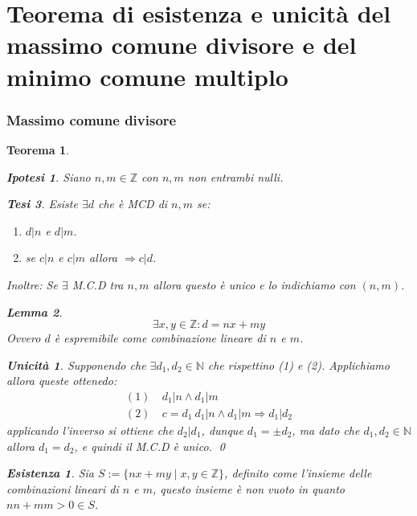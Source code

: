 \documentclass{article}
\makeatletter
\renewenvironment{proof}[1][\proofname]{\par
    \pushQED{\qed}%
    \normalfont \topsep6\p@\@plus6\p@\relax
    \trivlist
    \item\relax
    {\itshape
    #1\@addpunct{.}}\hspace\labelsep\ignorespaces
    }{%
    \popQED\endtrivlist\@endpefalse
}
\newtheorem{theorem}{Teorema}[part]
\newtheorem{lemma}{Lemma}[theorem]
\newtheorem{ipothesis}[lemma]{Ipotesi}
\newtheorem{thesis}[lemma]{Tesi}
\newtheorem*{existence}{Esistenza}
\newtheorem*{uniqueness}{Unicità}
\makeatother
\begin{document}
\part{Teorema di esistenza e unicità del massimo comune divisore e del minimo comune multiplo}
\section{Massimo comune divisore}
\begin{theorem}
    \begin{ipothesis}
        Siano \(n,m\in\mathbb{Z}\) con \(n,m\) non entrambi nulli.
    \end{ipothesis}
    \begin{thesis}
        Esiste \(\exists d\) che è MCD di \(n,m\) se:
        \begin{enumerate}
            \item \(d|n\) e \(d|m\).
            \item se \(c|n\) e \(c|m\) allora \(\Rightarrow c|d\).
        \end{enumerate} 
        Inoltre: Se \(\exists\) M.C.D tra \(n,m\) allora questo è unico e lo indichiamo con \((n,m)\).
        \begin{lemma}
            \[
                \exists x,y\in\mathbb{Z}: d=nx+my
            \]
            Ovvero \(d\) è espremibile come combinazione lineare di \(n\) e \(m\).
        \end{lemma}
    \end{thesis}
    \begin{proof}
        \begin{uniqueness}
            Supponendo che \(\exists d_1,d_2\in\mathbb{N}\) che rispettino (1) e (2). Applichiamo allora queste ottenedo:
            \[
                \begin{aligned}
                    (1)&\ d_1|n \wedge d_1|m\\
                    (2)&\ c=d_1\ d_1|n \wedge d_1|m \Rightarrow d_1|d_2
                \end{aligned}
            \]
            applicando l'inverso si ottiene che \(d_2|d_1\), dunque \(d_1=\pm d_2\), ma dato che \(d_1,d_2\in\mathbb{N}\) allora \(d_1=d_2\), e quindi il M.C.D è unico.
            \qed
        \end{uniqueness}
        \begin{existence}
            Sia \(S:=\{nx+my\mid x,y\in\mathbb{Z}\}\), definito come l'insieme delle combinazioni lineari di \(n\) e \(m\), questo insieme è non vuoto in quanto \(nn+mm>0\in S\).

\end{existence}
\end{proof}
\end{theorem}
\end{document}
